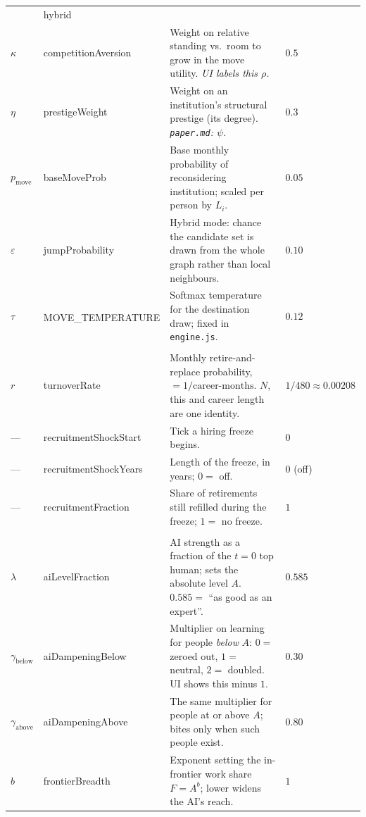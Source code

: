 \documentclass[11pt]{article}
\newcommand{\dither}{\textnormal{---}}
\newcommand{\dg}{\textsuperscript{\dag}}
\begin{document}
\begin{longtable}{L{1.6cm} K{2.9cm} L{6.8cm} S{2.5cm}}
  & hybrid \\
$\kappa$ & competitionAversion & Weight on relative standing vs.\ room to grow in
  the move utility. \emph{UI labels this $\rho$.}
  & $0.5$ \\
$\eta$ & prestigeWeight & Weight on an institution's structural prestige (its
  degree). \emph{\texttt{paper.md}: $\psi$.}
  & $0.3$ \\
$p_{\text{move}}$ & baseMoveProb & Base monthly probability of reconsidering
  institution; scaled per person by $L_i$.
  & $0.05$ \\
$\varepsilon$ & jumpProbability & Hybrid mode: chance the candidate set is drawn
  from the whole graph rather than local neighbours.
  & $0.10$ \\
$\tau$ & MOVE\_TEMPERATURE\dg & Softmax temperature for the destination draw;
  fixed in \texttt{engine.js}.
  & $0.12$ \\
\addlinespace
{}\\[2pt]
$r$ & turnoverRate & Monthly retire-and-replace probability,
  $= 1/\text{career-months}$. $N$, this and career length are one identity.
  & $1/480 \approx 0.00208$ \\
\dither & recruitmentShockStart & Tick a hiring freeze begins.
  & $0$ \\
\dither & recruitmentShockYears & Length of the freeze, in years; $0 = $ off.
  & $0$ (off) \\
\dither & recruitmentFraction & Share of retirements still refilled during the
  freeze; $1 = $ no freeze.
  & $1$ \\
\addlinespace
{}\\[2pt]
$\lambda$ & aiLevelFraction & AI strength as a fraction of the $t=0$ top human;
  sets the absolute level $A$. $0.585 = $ ``as good as an expert''.
  & $0.585$ \\
$\gamma_{\text{below}}$ & aiDampeningBelow & Multiplier on learning for people
  \emph{below} $A$: $0 = $ zeroed out, $1 = $ neutral, $2 = $ doubled. UI shows
  this minus $1$.
  & $0.30$ \\
$\gamma_{\text{above}}$ & aiDampeningAbove & The same multiplier for people at or
  above $A$; bites only when such people exist.
  & $0.80$ \\
$b$ & frontierBreadth & Exponent setting the in-frontier work share $F = A^{b}$;
  lower widens the AI's reach.
  & $1$ \\

\end{longtable}
\end{document}
